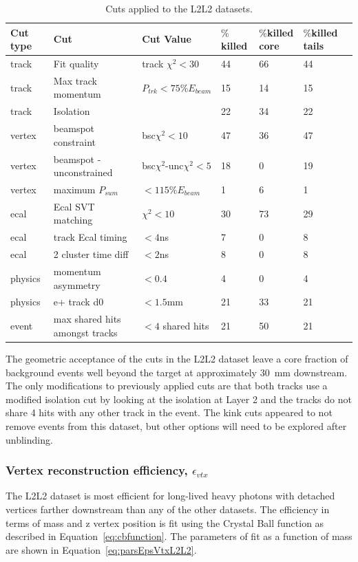 \documentclass[twoside]{article}
\begin{document}
\begin{table}[H]
\caption{Cuts applied to the L2L2 datasets.}
\label{l2l2_cuts}
\centering
\begin{tabular}{lllllll}
\toprule
Cut type & Cut & Cut Value &  $\%$killed &  $\%$killed core & $\%$killed tails\\
\midrule
track & Fit quality & track $\chi^{2}<30$ & 44 & 66 & 44 \\
track & Max track momentum &  $P_{trk}<75\%E_{beam}$ & 15 & 14 & 15 \\
track & Isolation &   & 22 & 34 & 22 \\
vertex & beamspot constraint & bsc$\chi^{2}<10$  & 47 & 36 & 47 \\
vertex & beamspot - unconstrained & bsc$\chi^{2}$-unc$\chi^2<5$  & 18 & 0 & 19 \\
vertex & maximum $P_{sum}$ &  $<115\%E_{beam}$ & 1 & 6 & 1 \\
ecal & Ecal SVT matching & $\chi^2<10$  & 30 & 73 & 29 \\
ecal & track Ecal timing & $<4$ns  & 7 & 0 & 8 \\
ecal & 2 cluster time diff & $<2$ns  & 8 & 0 & 8 \\
physics & momentum asymmetry & $<0.4$  & 4 & 0 & 4 \\
physics & e+ track d0 & $<1.5$mm  & 21 & 33 & 21 \\
event & max shared hits amongst tracks & $<4$ shared hits  & 21 & 50 & 21 \\
\bottomrule
\end{tabular}
\end{table}

The geometric acceptance of the cuts in the L2L2 dataset leave a core fraction of background events well beyond the target at approximately 30~mm downstream. The only modifications to previously applied cuts are that both tracks use a modified isolation cut by looking at the isolation at Layer 2 and the tracks do not share 4 hits with any other track in the event.  The kink cuts appeared to not remove events from this dataset, but other options will need to be explored after unblinding. 

\subsubsection{Vertex reconstruction efficiency, $\epsilon_{vtx}$}

The L2L2 dataset is most efficient for long-lived heavy photons with detached vertices farther downstream than any of the other datasets. The efficiency in terms of mass and z vertex position is fit using the Crystal Ball function as described in Equation~\eqref{eq:cbfunction}. The parameters of fit as a function of mass are shown in Equation~\eqref{eq:parsEpsVtxL2L2}.
\end{document}
